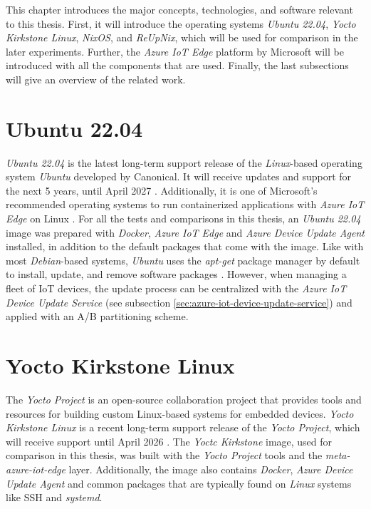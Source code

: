 This chapter introduces the major concepts, technologies,
and software relevant to this thesis. First, it will introduce the operating
systems \textit{Ubuntu 22.04}, \textit{Yocto Kirkstone Linux}, \textit{NixOS},
and \textit{ReUpNix}, which will be used for comparison in the later experiments.
Further, the \textit{Azure IoT Edge} platform by Microsoft will be introduced
with all the components that are used.
Finally, the last subsections will give an overview of the related work.

\section{Ubuntu 22.04}
\textit{Ubuntu 22.04} is the latest long-term support release of the
\textit{Linux}-based operating system \textit{Ubuntu} developed by Canonical.
It will receive updates and support for the next 5 years, until April
2027 \cite{ubuntu-releasenote}. Additionally, it is one of Microsoft's
recommended operating systems to run containerized applications with
\textit{Azure IoT Edge} on Linux \cite{msdoc-supportetplatforms}. For all the
tests and comparisons in this thesis, an \textit{Ubuntu 22.04} image was prepared
with \textit{Docker}, \textit{Azure IoT Edge} and \textit{Azure Device Update Agent}
installed, in addition to the default packages that come with the image. Like
with most \textit{Debian}-based systems, \textit{Ubuntu} uses the \textit{apt-get}
package manager by default to install, update, and remove software packages \cite{book:344012}.
However, when managing a fleet of \ac{IoT} devices, the update process can be
centralized with the \textit{Azure IoT Device Update Service} (see subsection
\ref{sec:azure-iot-device-update-service}) and applied with an A/B partitioning scheme.

\section{Yocto Kirkstone Linux}
The \textit{Yocto Project} is an open-source collaboration project that provides tools
and resources for building custom Linux-based systems for embedded devices.
\textit{Yocto Kirkstone Linux} is a recent long-term support release of the
\textit{Yocto Project}, which will receive support until April 2026 \cite{yocto-releases}.
The \textit{Yoctc Kirkstone} image, used for comparison in this thesis, was built
with the \textit{Yocto Project} tools and the \textit{meta-azure-iot-edge} layer.
Additionally, the image also contains \textit{Docker}, \textit{Azure Device Update Agent}
and common packages that are typically found on \textit{Linux} systems like \ac{SSH}
and \textit{systemd}.


